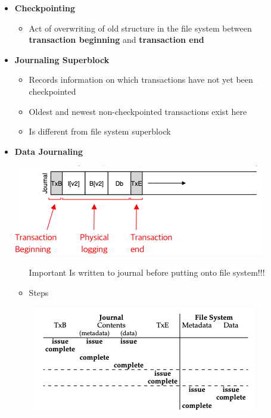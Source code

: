 \documentclass[12pt]{article}
\begin{document}
\begin{enumerate}[1.]
\begin{enumerate}[a)]
\begin{itemize}
            \item \textbf{Checkpointing}
            \begin{itemize}
                \item Act of overwriting of old structure in the file system between
                \textbf{transaction beginning} and \textbf{transaction end}
            \end{itemize}

            \item \textbf{Journaling Superblock}

            \begin{itemize}
                \item Records information on which transactions have not yet been checkpointed
                \item Oldest and newest non-checkpointed transactions exist here
                \item Is different from file system superblock
            \end{itemize}
            \item \textbf{Data Journaling}

            \begin{center}
            \includegraphics[width=0.8\linewidth]{../images/midterm_4_solution_35.png}
            \end{center}

            \begin{itemize}
                \item [\color{red}Important\color{black}] Is written to journal before putting onto file system!!!
                \item Steps

                \begin{center}
                \includegraphics[width=0.8\linewidth]{../images/midterm_4_solution_41.png}
                \end{center}


\end{itemize}
\end{itemize}
\end{enumerate}
\end{enumerate}
\end{document}
